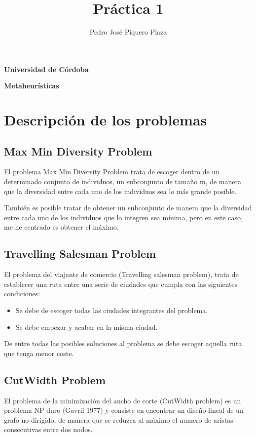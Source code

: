 \documentclass[12pt,a4paper,draft,openany]{article}
\author{Pedro José Piquero Plaza}
\title{Práctica 1}
\begin{document}
 \maketitle
 
 \begin{center}
 \textbf{Universidad de Córdoba}
 \end{center}
 
\begin{center}
\textbf{Metaheurísticas}
\end{center} 
 \newpage
 \tableofcontents
 \newpage
 \section{Descripción de los problemas}
 \subsection{Max Min Diversity Problem}
 El problema Max Min Diversity Problem trata de escoger dentro de un determinado conjunto de individuos, un subconjunto de tamaño m, de manera que la diversidad entre cada uno de
 los individuos sea lo más grande posible.
 
 También es posible tratar de obtener un subconjunto de manera que la diversidad entre cada uno de los individuos que lo integren sea mínima, pero en este caso, me he centrado es obtener el máximo.
 \subsection{Travelling Salesman Problem}
 El problema del viajante de comercio (Travelling salesman problem), trata de establecer una ruta entre una serie de ciudades que cumpla con las siguientes condiciones:
 
 \begin{itemize}
 \item Se debe de escoger todas las ciudades integrantes del problema.
 \item Se debe empezar y acabar en la misma ciudad.
 \end{itemize}
 
De entre todas las posibles soluciones al problema se debe escoger aquella ruta que tenga menor coste.
 
 \subsection{CutWidth Problem}
El problema de la minimización del ancho de corte (CutWidth problem) es un problema NP-duro (Gavril 1977) y consiste en encontrar un diseño lineal de un grafo no dirigido, de manera que se reduzca al máximo el numero de aristas consecutivas entre dos nodos.
\end{document}
